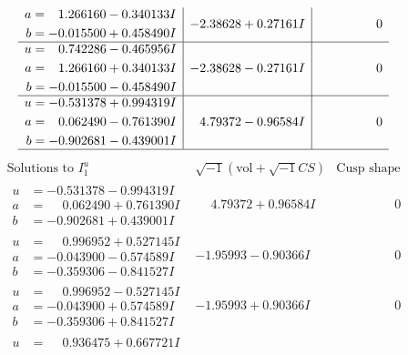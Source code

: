 \documentclass[1p]{elsarticle_modified}
\theoremstyle{definition}
\newcommand{\I}{\sqrt{-1}}
\begin{document}
$$\begin{array}{c|c|c}
\begin{aligned}
a &= \phantom{-}1.266160 - 0.340133 I \\
b &= -0.015500 + 0.458490 I\end{aligned}
 & -2.38628 + 0.27161 I & \phantom{-0.000000 } 0 \\ \hline\begin{aligned}
u &= \phantom{-}0.742286 - 0.465956 I \\
a &= \phantom{-}1.266160 + 0.340133 I \\
b &= -0.015500 - 0.458490 I\end{aligned}
 & -2.38628 - 0.27161 I & \phantom{-0.000000 } 0 \\ \hline\begin{aligned}
u &= -0.531378 + 0.994319 I \\
a &= \phantom{-}0.062490 - 0.761390 I \\
b &= -0.902681 - 0.439001 I\end{aligned}
 & \phantom{-}4.79372 - 0.96584 I & \phantom{-0.000000 } 0\\
 \hline 
 \end{array}$$\newpage$$\begin{array}{c|c|c}  
\text{Solutions to }I^u_{1}& \I (\text{vol} + \sqrt{-1}CS) & \text{Cusp shape}\\
 \hline 
\begin{aligned}
u &= -0.531378 - 0.994319 I \\
a &= \phantom{-}0.062490 + 0.761390 I \\
b &= -0.902681 + 0.439001 I\end{aligned}
 & \phantom{-}4.79372 + 0.96584 I & \phantom{-0.000000 } 0 \\ \hline\begin{aligned}
u &= \phantom{-}0.996952 + 0.527145 I \\
a &= -0.043900 - 0.574589 I \\
b &= -0.359306 - 0.841527 I\end{aligned}
 & -1.95993 - 0.90366 I & \phantom{-0.000000 } 0 \\ \hline\begin{aligned}
u &= \phantom{-}0.996952 - 0.527145 I \\
a &= -0.043900 + 0.574589 I \\
b &= -0.359306 + 0.841527 I\end{aligned}
 & -1.95993 + 0.90366 I & \phantom{-0.000000 } 0 \\ \hline\begin{aligned}
u &= \phantom{-}0.936475 + 0.667721 I \\

\end{aligned}
\end{array}$$
\end{document}

